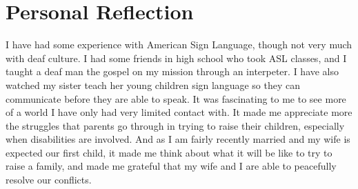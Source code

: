 \documentclass[onecolumn, 12pt]{article}
\begin{document}
\section*{Personal Reflection}

I have had some experience with American Sign Language, though not very much
with deaf culture.  I had some friends in high school who took ASL classes, and
I taught a deaf man the gospel on my mission through an interpeter.  I have
also watched my sister teach her young children sign language so they can
communicate before they are able to speak.  It was fascinating to me to see
more of a world I have only had very limited contact with.  It made me
appreciate more the struggles that parents go through in trying to raise their
children, especially when disabilities are involved.  And as I am fairly
recently married and my wife is expected our first child, it made me think
about what it will be like to try to raise a family, and made me grateful that
my wife and I are able to peacefully resolve our conflicts.
\end{document}
